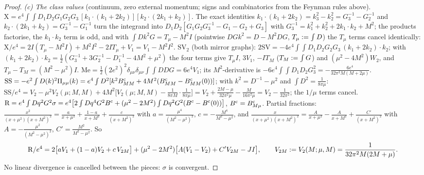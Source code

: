 \begin{proof}
\emph{(c) The class values} (continuum, zero external momentum; signs and combinatorics from the Feynman rules above).
$\mathrm X=e^4\int\!\!\int D_1D_2G_1G_2G_3\,[k_1\cdot(k_1+2k_2)][k_2\cdot(2k_1+k_2)]$. The exact identities $k_1\cdot(k_1+2k_2)=k_3^2-k_2^2=G_3^{-1}-G_2^{-1}$ and $k_2\cdot(2k_1+k_2)=G_3^{-1}-G_1^{-1}$ turn the integrand into $D_1D_2[G_1G_2G_3^{-1}-G_1-G_2+G_3]$ with $G_3^{-1}=k_1^2+k_2^2+2k_1\cdot k_2+M^2$; the products factorise, the $k_1\cdot k_2$ term is odd, and with $\int Dk^2G=T_\mu-M^2I$ (pointwise $DGk^2=D-M^2DG$, $T_\mu:=\int D$) the $T_\mu$ terms cancel identically: $\mathrm X/e^4=2I(T_\mu-M^2I)+M^2I^2-2IT_\mu+V_1=V_1-M^2I^2$.
$\mathrm{SV}_2$ (both mirror graphs): $2\mathrm{SV}=-4e^4\int\!\!\int D_1D_2G_2G_3\,(k_1+2k_2)\cdot k_2$; with $(k_1+2k_2)\cdot k_2=\frac12(G_3^{-1}+3G_2^{-1}-D_1^{-1}-4M^2+\mu^2)$ the four terms give $T_\mu I$, $3V_1$, $-IT_M$ ($T_M:=\int G$) and $(\mu^2-4M^2)W_2$, and $T_\mu-T_M=(M^2-\mu^2)I$.
$\mathrm{Me}=\frac12(2e^2)^2\delta_{\mu\nu}\delta_{\mu\nu}\int\!\!\int DDG=6e^4V_1$; its $M^2$-derivative is $-6e^4\int\!\!\int D_1D_2G_3^2=-\frac{6e^4}{32\pi^2M(M+2\mu)}$.
$\mathrm{SS}=-e^2\int D(k)^2\Pi_{\mu\mu}(k)=e^4\int D^2[k^2B^{\mathrm c}_{MM}+4M^2(B^{\mathrm c}_{MM}-B^{\mathrm c}_{MM}(0))]$; with $k^2=D^{-1}-\mu^2$ and $\int D^2=\frac1{8\pi\mu}$: $\mathrm{SS}/e^4=V_2-\mu^2V_2(\mu;M,M)+4M^2\big[V_2(\mu;M,M)-\frac1{8\pi M}\cdot\frac1{8\pi\mu}\big]=V_2+\frac{2M-\mu}{32\pi^2\mu}-\frac M{16\pi^2\mu}=V_2-\frac1{32\pi^2}$; the $1/\mu$ terms cancel.
$\mathrm R=e^4\int Dq^2G^2\sigma=e^4\big[2\int Dq^4G^2B^{\mathrm c}+(\mu^2-2M^2)\int Dq^2G^2(B^{\mathrm c}-B^{\mathrm c}(0))\big]$, $B^{\mathrm c}=B^{\mathrm c}_{M\mu}$. Partial fractions: $\frac{x^2}{(x+\mu^2)(x+M^2)^2}=\frac a{x+\mu^2}+\frac{1-a}{x+M^2}+\frac c{(x+M^2)^2}$ with $a=\frac{\mu^4}{(M^2-\mu^2)^2}$, $c=-\frac{M^4}{M^2-\mu^2}$, and $\frac x{(x+\mu^2)(x+M^2)^2}=\frac A{x+\mu^2}-\frac A{x+M^2}+\frac{C'}{(x+M^2)^2}$ with $A=-\frac{\mu^2}{(M^2-\mu^2)^2}$, $C'=\frac{M^2}{M^2-\mu^2}$. So
\[
\mathrm R/e^4=2\big[aV_1+(1-a)V_2+c\,V_{2M}\big]+(\mu^2-2M^2)\big[A(V_1-V_2)+C'V_{2M}-JI\big],\qquad V_{2M}:= V_2(M;\mu,M)=\frac1{32\pi^2M(2M+\mu)}.
\]
No linear divergence is cancelled between the pieces: $\sigma$ is convergent.


\end{proof}
